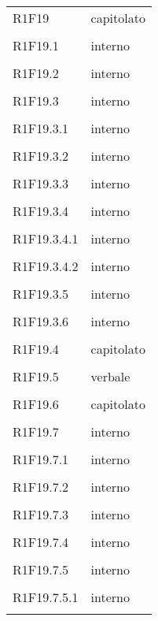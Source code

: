 \documentclass[a4paper]{article}
\begin{document}
\begin{longtable}{ >{\centering}p{}
		>{\centering}p{}}
	R1F19 & capitolato\\\tabularnewline
	
	R1F19.1 & interno\\\tabularnewline
	
	R1F19.2 & interno\\\tabularnewline
	
	R1F19.3 & interno\\\tabularnewline
	
	R1F19.3.1 & interno\\\tabularnewline
	
	R1F19.3.2 & interno\\\tabularnewline
	
	R1F19.3.3 & interno\\\tabularnewline
	
	R1F19.3.4 & interno\\\tabularnewline
	
	R1F19.3.4.1 & interno\\\tabularnewline
	
	R1F19.3.4.2 & interno\\\tabularnewline
	
	R1F19.3.5 & interno\\\tabularnewline
	
	R1F19.3.6 & interno\\\tabularnewline
	
	R1F19.4 & capitolato\\\tabularnewline
	
	R1F19.5 & verbale\\\tabularnewline
	
	R1F19.6 & capitolato\\\tabularnewline
	
	R1F19.7 & interno\\\tabularnewline
	
	R1F19.7.1 & interno\\\tabularnewline
	
	R1F19.7.2 & interno\\\tabularnewline
	
	R1F19.7.3 & interno\\\tabularnewline
	
	R1F19.7.4 & interno\\\tabularnewline
	
	R1F19.7.5 & interno\\\tabularnewline
	
	R1F19.7.5.1 & interno\\\tabularnewline
	

\end{longtable}
\end{document}
